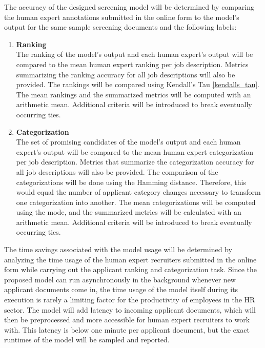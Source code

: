 \documentclass[draft,final]{thesisclass} %
\begin{document}
The accuracy of the designed screening model will be determined by comparing the human expert annotations submitted in the online form to the model's output for the same sample screening documents and the following labels:
\begin{enumerate}
    \item \textbf{Ranking}\\
    The ranking of the model's output and each human expert's output will be compared to the mean human expert ranking per job description.
    Metrics summarizing the ranking accuracy for all job descriptions will also be provided.
    The rankings will be compared using Kendall's Tau \ref{kendalls_tau}.
    The mean rankings and the summarized metrics will be computed with an arithmetic mean.
    Additional criteria will be introduced to break eventually occurring ties.
    \item \textbf{Categorization}\\
    The set of promising candidates of the model's output and each human expert's output will be compared to the mean human expert categorization per job description.
    Metrics that summarize the categorization accuracy for all job descriptions will also be provided.
    The comparison of the categorizations will be done using the Hamming distance.
    Therefore, this would equal the number of applicant category changes necessary to transform one categorization into another.
    The mean categorizations will be computed using the mode, and the summarized metrics will be calculated with an arithmetic mean.
    Additional criteria will be introduced to break eventually occurring ties.
\end{enumerate}

The time savings associated with the model usage will be determined by analyzing the time usage of the human expert recruiters submitted in the online form while carrying out the applicant ranking and categorization task.
Since the proposed model can run asynchronously in the background whenever new applicant documents come in, the time usage of the model itself during its execution is rarely a limiting factor for the productivity of employees in the \acs{HR} sector.
The model will add latency to incoming applicant documents, which will then be preprocessed and more accessible for human expert recruiters to work with.
This latency is below one minute per applicant document, but the exact runtimes of the model will be sampled and reported.
\end{document}
